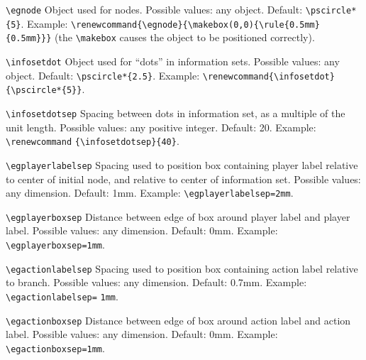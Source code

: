 \documentclass[12pt]{article}
\begin{document}
\noindent\verb+\egnode+\newline
\noindent Object used for nodes.  Possible values: any object.  Default:
\verb+\pscircle*{5}+.  Example:
\verb+\renewcommand{\egnode}{\makebox(0,0){\rule{0.5mm}{0.5mm}}}+ (the
\verb+\makebox+ causes the object to be positioned correctly).

\vspace{4mm}

\sloppy
\noindent\verb+\infosetdot+\newline
\noindent Object used for ``dots'' in information sets.  Possible values: any
object.  Default: \verb+\pscircle*{2.5}+.  Example:
\verb+\renewcommand{\infosetdot}+ \verb+{\pscircle*{5}}+.

\fussy
\vspace{4mm}

\noindent\verb+\infosetdotsep+\newline
\noindent Spacing between dots in information set, as a multiple of the unit
length.  Possible values: any positive integer.  Default: 20.  Example:
\verb+\renewcommand+ \verb+{\infosetdotsep}{40}+.

\vspace{4mm}

\noindent\verb+\egplayerlabelsep+\newline
\noindent Spacing used to position box containing player label relative to
center of initial node, and relative to center of information set.  Possible
values: any dimension.  Default: 1mm.  Example: \verb+\egplayerlabelsep=2mm+.

\vspace{4mm}

\noindent\verb+\egplayerboxsep+\newline
\noindent Distance between edge of box around player label and player label. 
Possible values: any dimension.  Default: 0mm.  Example:
\verb+\egplayerboxsep=1mm+.

\vspace{4mm}

\noindent\verb+\egactionlabelsep+\newline
\noindent Spacing used to position box containing action label relative to
branch.  Possible values: any dimension.  Default: 0.7mm.  Example:
\verb+\egactionlabelsep=+ \verb+1mm+.

\vspace{4mm}

\noindent\verb+\egactionboxsep+\newline
\noindent Distance between edge of box around action label and action label. 
Possible values: any dimension.  Default: 0mm.  Example:
\verb+\egactionboxsep=1mm+.
\end{document}
